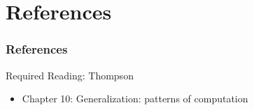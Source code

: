 \documentclass[dvipsnames]{beamer}
\theoremstyle{plain}
\begin{document}
\section*{References}

\begin{frame}
  \frametitle{References}

  \begin{block}{Required Reading: Thompson}
    \begin{itemize}
      \item Chapter 10: \alert{Generalization: patterns of computation}
    \end{itemize}
  \end{block}
\end{frame}
\end{document}
